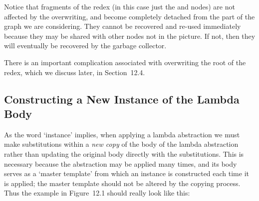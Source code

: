 
Notice that fragments of the redex (in this case just the  and  nodes)
are not affected by the overwriting, and become completely detached from
the part of the graph we are considering. They cannot be recovered and
re-used immediately because they may be shared with other nodes not in the
picture. If not, then they will eventually be recovered by the garbage
collector.

There is an important complication associated with overwriting the root of
the redex, which we discuss later, in Section~12.4.

\subsection{Constructing a New Instance of the Lambda Body}

As the word `instance' implies, when applying a lambda abstraction we must
make substitutions within a \textit{new copy} of the body of the lambda abstraction
rather than updating the original body directly with the substitutions. This is
necessary because the abstraction may be applied many times, and its body
serves as a `master template' from which an instance is constructed each time
it is applied; the master template should not be altered by the copying process.
Thus the example in Figure~12.1 should really look like this:

